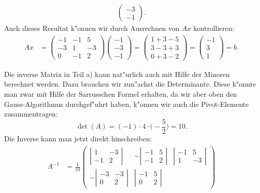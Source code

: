 \begin{loesung}
\begin{teilaufgaben}
\begin{align*}
\begin{pmatrix}
-3\\
-1
\end{pmatrix}.
\end{align*}
Auch dieses Resultat k"onnen wir durch Ausrechnen von $Ax$ kontrollieren:
\begin{align*}
Ax
&=
\begin{pmatrix}
  -1& -1&  5\\
  -3&  1& -3\\
   0& -1&  2
\end{pmatrix}
\begin{pmatrix}
-1\\-3\\-1
\end{pmatrix}
=
\begin{pmatrix}
1+3-5\\
3-3+3\\
0+3-2
\end{pmatrix}
=
\begin{pmatrix}
-1\\3\\1
\end{pmatrix}
=b.
\end{align*}
\end{teilaufgaben}
Die inverse Matrix in Teil a) kann nat"urlich auch mit Hilfe der
Minoren berechnet werden.
Dazu brauchen wir zun"achst die Determinante.
Diese k"onnte man zwar mit
Hilfe der Sarrusschen Formel erhalten, da wir aber oben den Gauss-Algorithmus
durchgef"uhrt haben, k"onnen wir auch die Pivot-Elemente zusammentragen:
\[
\det(A)
=
(-1)\cdot 4\cdot \biggl(-\frac52\biggr)
=
10.
\]
Die Inverse kann man jetzt direkt hinschreiben:
\begin{align*}
A^{-1}
&=
\frac1{10}
\begin{pmatrix}
\left|\begin{matrix} 1&-3\\-1& 2\end{matrix}\right|&
-\left|\begin{matrix}-1& 5\\-1& 2\end{matrix}\right|&
\left|\begin{matrix}-1& 5\\ 1&-3\end{matrix}\right|\\
-\left|\begin{matrix}-3&-3\\ 0& 2\end{matrix}\right|&
\left|\begin{matrix}-1& 5\\ 0& 2\end{matrix}\right|&

\end{pmatrix}
\end{align*}
\end{loesung}
